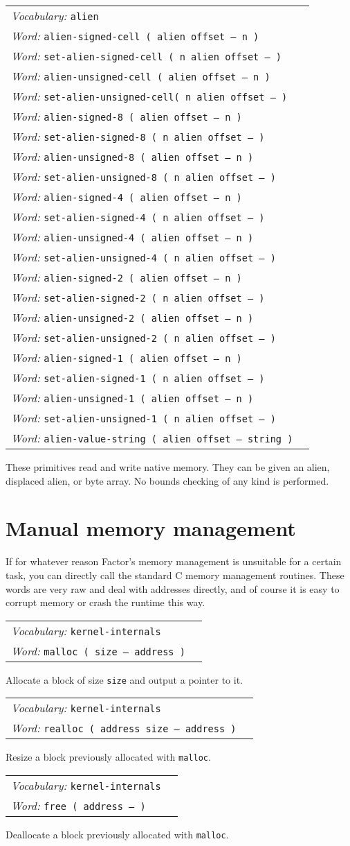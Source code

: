 \documentclass{book}
\newcommand{\vocabulary}[1]{\emph{Vocabulary:} \texttt{#1}&\\}
\newcommand{\ordinaryword}[2]{\index{\texttt{#1}}\emph{Word:} \texttt{#2}&\\}
\newcommand{\wordtable}[1]{


\begin{tabularx}{12cm}{lX}
\hline
#1
\hline
\end{tabularx}

}
\begin{document}
\wordtable{
\vocabulary{alien}
\ordinaryword{alien-signed-cell}{alien-signed-cell ( alien offset -- n )}
\ordinaryword{set-alien-signed-cell}{set-alien-signed-cell ( n alien offset -- )}
\ordinaryword{alien-unsigned-cell}{alien-unsigned-cell ( alien offset -- n )}
\ordinaryword{set-alien-unsigned-cell}{set-alien-unsigned-cell( n alien offset -- )}
\ordinaryword{alien-signed-8}{alien-signed-8 ( alien offset -- n )}
\ordinaryword{set-alien-signed-8}{set-alien-signed-8 ( n alien offset -- )}
\ordinaryword{alien-unsigned-8}{alien-unsigned-8 ( alien offset -- n )}
\ordinaryword{set-alien-unsigned-8}{set-alien-unsigned-8 ( n alien offset -- )}
\ordinaryword{alien-signed-4}{alien-signed-4 ( alien offset -- n )}
\ordinaryword{set-alien-signed-4}{set-alien-signed-4 ( n alien offset -- )}
\ordinaryword{alien-unsigned-4}{alien-unsigned-4 ( alien offset -- n )}
\ordinaryword{set-alien-unsigned-4}{set-alien-unsigned-4 ( n alien offset -- )}
\ordinaryword{alien-signed-2}{alien-signed-2 ( alien offset -- n )}
\ordinaryword{set-alien-signed-2}{set-alien-signed-2 ( n alien offset -- )}
\ordinaryword{alien-unsigned-2}{alien-unsigned-2 ( alien offset -- n )}
\ordinaryword{set-alien-unsigned-2}{set-alien-unsigned-2 ( n alien offset -- )}
\ordinaryword{alien-signed-1}{alien-signed-1 ( alien offset -- n )}
\ordinaryword{set-alien-signed-1}{set-alien-signed-1 ( n alien offset -- )}
\ordinaryword{alien-unsigned-1}{alien-unsigned-1 ( alien offset -- n )}
\ordinaryword{set-alien-unsigned-1}{set-alien-unsigned-1 ( n alien offset -- )}
\ordinaryword{alien-value-string}{alien-value-string ( alien offset -- string )}
}
These primitives read and write native memory. They can be given an alien, displaced alien, or byte array. No bounds checking of any kind is performed.

\section{Manual memory management}\label{malloc}

If for whatever reason Factor's memory management is unsuitable for a certain task, you can
directly call the standard C memory management routines. These words are very raw and deal with addresses directly, and of course it is easy to corrupt memory or crash the runtime
this way.
\wordtable{
\vocabulary{kernel-internals}
\ordinaryword{malloc}{malloc ( size -- address )}
}
Allocate a block of size \verb|size| and output a pointer to it.
\wordtable{
\vocabulary{kernel-internals}
\ordinaryword{realloc}{realloc ( address size -- address )}
}
Resize a block previously allocated with \verb|malloc|.
\wordtable{
\vocabulary{kernel-internals}
\ordinaryword{free}{free ( address -- )}
}
Deallocate a block previously allocated with \verb|malloc|.
\end{document}
